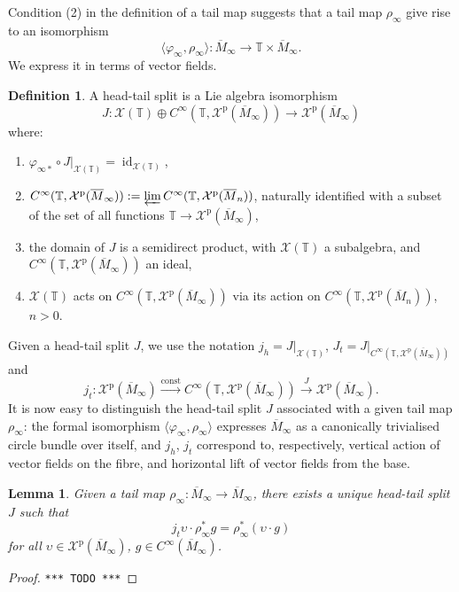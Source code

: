 \documentclass{article}
\def\MISS{\texttt{*** TODO ***}}
\def\TT{\mathbb{T}}
\def\XX{\mathcal{X}}
\DeclareMathOperator{\id}{\mathrm{id}}
\def\p{\mathrm{p}}
\newtheorem{lem}{Lemma}
\theoremstyle{definition}
\newtheorem{defn}{Definition}
\begin{document}
Condition (2) in the definition of a tail map suggests that
a tail map $\rho_\infty$ give rise to an isomorphism
$$\langle \varphi_\infty,\rho_\infty\rangle : \overline M_\infty \to \TT\times\overline M_\infty.$$
We express it in terms of vector fields.
\begin{defn}
        A head-tail split is a Lie algebra isomorphism
$$
J : \XX(\TT) \oplus C^\infty(\TT, \XX^\p(\overline M_\infty)) \to \XX^\p(\overline M_\infty)
$$
where:
\begin{enumerate}
        \item $\varphi_{\infty*}\circ J|_{\XX(\TT)} = \id_{\XX(\TT)}$,
        \item $C^\infty(\TT,\XX^\p(\overline M_\infty)):=\varprojlim C^\infty(\TT,\XX^\p(\overline M_n))$, naturally identified with a subset of the set of all functions $\TT \to \XX^\p(\overline M_\infty)$,
        \item the domain of $J$ is a semidirect product, with  $\XX(\TT)$ a subalgebra, and $C^\infty(\TT,\XX^\p(\overline M_\infty))$ an ideal,
        \item $\XX(\TT)$ acts on $C^\infty(\TT, \XX^\p(\overline M_\infty))$
                via its action on $C^\infty(\TT,\XX^\p(\overline M_n))$,  $n>0$.
\end{enumerate}
\end{defn}
Given a head-tail split $J$, we use the notation $ j_h=J|_{\XX(\TT)}$,
$J_t = J|_{C^\infty(\TT,\XX^\p(\overline M_\infty))}$
and $$ j_t : \XX^\p(\overline M_\infty)\xrightarrow{\mathrm{const}}C^\infty(\TT,\XX^\p(\overline M_\infty))
\xrightarrow{J} \XX^\p(\overline M_\infty).$$
It is now easy to distinguish the head-tail split $J$
associated with a given tail map $\rho_\infty$:
the formal isomorphism $\langle \varphi_\infty,\rho_\infty\rangle$
expresses $\overline M_\infty$
as a canonically trivialised circle bundle over itself,
and $j_h$, $j_t$
correspond to, respectively, vertical action of vector fields on the fibre, and
horizontal lift of vector fields from the base.
\begin{lem}\label{lem:hts}
        Given a tail map $\rho_\infty : \overline M_\infty \to \overline M_\infty$,
        there exists a unique head-tail split $J$
        such that $$ j_t \upsilon \cdot \rho_\infty^* g = \rho_\infty^* (\upsilon \cdot g)$$
        for all $\upsilon \in \XX^\p(\overline M_\infty)$, $g \in C^\infty(\overline M_\infty)$.
\end{lem}
\begin{proof}\MISS{}\end{proof}
\end{document}
